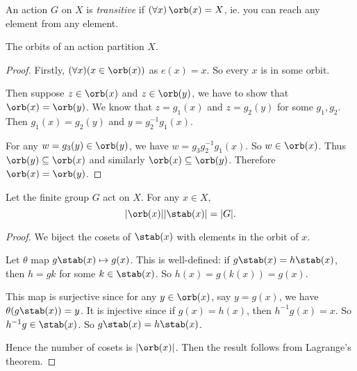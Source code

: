 \documentclass[a4paper]{article}
\begin{document}
\begin{defi}
  An action $G$ on $X$ is \emph{transitive} if $(\forall x)\,\orb(x) = X$, ie. you can reach any element from any element.
\end{defi}

\begin{lemma}
  The orbits of an action partition $X$.
\end{lemma}

\begin{proof}
  Firstly, $(\forall x)(x\in \orb (x))$ as $e(x) = x$. So every $x$ is in some orbit.

  Then suppose $z\in \orb (x)$ and $z\in \orb (y)$, we have to show that $\orb(x) = \orb (y)$. We know that $z = g_1(x)$ and $z = g_2(y)$ for some $g_1, g_2$. Then $g_1(x) = g_2(y)$ and $y = g_2^{-1}g_1(x)$.

  For any $w = g_3(y)\in \orb (y)$, we have $w = g_3g_2^{-1}g_1(x)$. So $w\in \orb (x)$. Thus $\orb (y) \subseteq \orb (x)$ and similarly $\orb (x) \subseteq \orb (y)$. Therefore $\orb (x) = \orb (y)$.
\end{proof}

\begin{thm}
  Let the finite group $G$ act on $X$. For any $x\in X$,
  \[
    |\orb(x)||\stab(x)| = |G|.
  \]
\end{thm}

\begin{proof}
  We biject the cosets of $\stab(x)$ with elements in the orbit of $x$.

  Let $\theta$ map $g\stab(x) \mapsto g(x)$. This is well-defined: if $g\stab(x) = h\stab(x)$, then $h = gk$ for some $k\in \stab(x)$. So $h(x) = g(k(x)) = g(x)$.

  This map is surjective since for any $y\in \orb(x)$, say $y = g(x)$, we have $\theta(g\stab (x)) = y$. It is injective since if $g(x) = h(x)$, then $h^{-1}g(x) = x$. So $h^{-1}g\in \stab (x)$. So $g\stab(x) = h\stab(x)$.

  Hence the number of cosets is $|\orb(x)|$. Then the result follows from Lagrange's theorem.
\end{proof}
\end{document}
